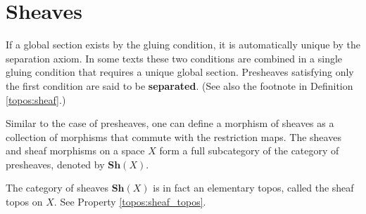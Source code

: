 \section{Sheaves}

    \begin{remark}
        If a global section exists by the gluing condition, it is automatically unique by the separation axiom. In some texts these two conditions are combined in a single gluing condition that requires a unique global section. Presheaves satisfying only the first condition are said to be \textbf{separated}. (See also the footnote in Definition \ref{topos:sheaf}.)
    \end{remark}

    \begin{notation}
        Similar to the case of presheaves, one can define a morphism of sheaves as a collection of morphisms that commute with the restriction maps. The sheaves and sheaf morphisms on a space $X$ form a full subcategory of the category of presheaves, denoted by $\mathbf{Sh}(X)$.
    \end{notation}
    \begin{property}
        The category of sheaves $\mathbf{Sh}(X)$ is in fact an elementary topos, called the sheaf topos on $X$. See Property \ref{topos:sheaf_topos}.
    \end{property}

